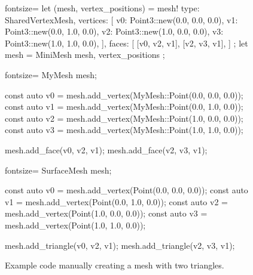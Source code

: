 \begin{figure}[p]
  \begin{minipage}{.04\textwidth}
  \end{minipage}
  \begin{minipage}{.9\textwidth}
    \begin{rustcode*}{fontsize=\footnotesize}
      let (mesh, vertex_positions) = mesh! {
          type: SharedVertexMesh,
          vertices: [
              v0: Point3::new(0.0, 0.0, 0.0),
              v1: Point3::new(0.0, 1.0, 0.0),
              v2: Point3::new(1.0, 0.0, 0.0),
              v3: Point3::new(1.0, 1.0, 0.0),
          ],
          faces: [
              [v0, v2, v1],
              [v2, v3, v1],
          ]
      };
      let mesh = MiniMesh { mesh, vertex_positions };
    \end{rustcode*}
  \end{minipage}\vspace{2mm}

  \begin{minipage}{.04\textwidth}
  \end{minipage}
  \begin{minipage}{.9\textwidth}
    \begin{cppcode*}{fontsize=\footnotesize}
      MyMesh mesh;

      const auto v0 = mesh.add_vertex(MyMesh::Point(0.0, 0.0, 0.0));
      const auto v1 = mesh.add_vertex(MyMesh::Point(0.0, 1.0, 0.0));
      const auto v2 = mesh.add_vertex(MyMesh::Point(1.0, 0.0, 0.0));
      const auto v3 = mesh.add_vertex(MyMesh::Point(1.0, 1.0, 0.0));

      mesh.add_face(v0, v2, v1);
      mesh.add_face(v2, v3, v1);
    \end{cppcode*}
  \end{minipage}\vspace{2mm}

  \begin{minipage}{.04\textwidth}
  \end{minipage}
  \begin{minipage}{.9\textwidth}
    \begin{cppcode*}{fontsize=\footnotesize}
      SurfaceMesh mesh;

      const auto v0 = mesh.add_vertex(Point(0.0, 0.0, 0.0));
      const auto v1 = mesh.add_vertex(Point(0.0, 1.0, 0.0));
      const auto v2 = mesh.add_vertex(Point(1.0, 0.0, 0.0));
      const auto v3 = mesh.add_vertex(Point(1.0, 1.0, 0.0));

      mesh.add_triangle(v0, v2, v1);
      mesh.add_triangle(v2, v3, v1);
    \end{cppcode*}
  \end{minipage}

  \caption{
    Example code manually creating a mesh with two triangles.
  }
  \label{fig:example-build}
\end{figure}


